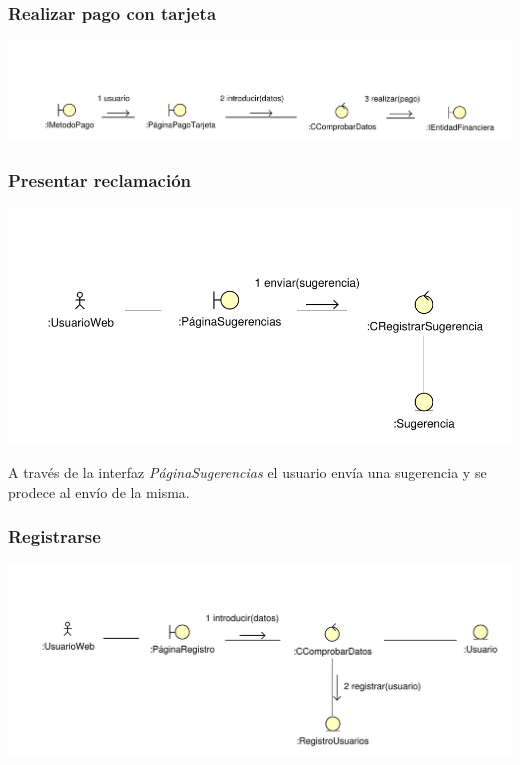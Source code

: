 \documentclass[11pt, a4paper, twoside, titlepage]{article}
\begin{document}
			\subsubsection{Realizar pago con tarjeta} \label{ana:tarjeta}
				\begin{center}
					\includegraphics[scale=.7]{analisis/diagramas/pagotarjeta.pdf}
				\end{center}

			\subsubsection{Presentar reclamación}
				\begin{center}
					\includegraphics[scale=.82]{analisis/diagramas/presentarreclamacion.pdf}
				\end{center}

					A través de la interfaz {\itshape PáginaSugerencias} el usuario envía una sugerencia y se prodece al envío de la misma.

			\subsubsection{Registrarse}
				\begin{center}
					\includegraphics[scale=.8]{analisis/diagramas/registrarse.pdf}
				\end{center}
\end{document}
